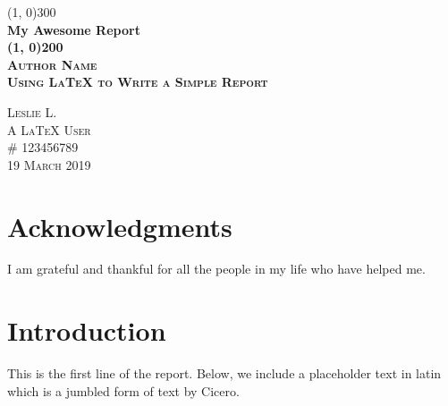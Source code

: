 \documentclass{article}
\begin{document}
\begin{titlepage}

\begin{center}
\line(1, 0){300}\\
[0.25in]
\huge\bfseries My Awesome Report\\
[2mm]
\line(1, 0){200}\\
[1.5cm]
\textsc{\LARGE Author Name}\\
[0.75cm]
\textsc{\Large Using LaTeX to Write a Simple Report}\\
[9cm]
\begin{flushright}
\textsc{\large Leslie L.\\
A LaTeX User\\
\# 123456789\\
19 March 2019\\}
\end{flushright}

\end{center}

\end{titlepage}

\section*{Acknowledgments}
I am grateful and thankful for all the people in my life who have helped me.

\cleardoublepage

\tableofcontents
\thispagestyle{empty}    %
\cleardoublepage
\setcounter{page}{1}    %

\listoffigures
{}
\cleardoublepage

\listoftables
{}
\cleardoublepage

\section{Introduction}\label{sec:intro}
This is the first line of the report.  Below, we include a placeholder text in latin which is
a jumbled form of text by Cicero.
\end{document}
